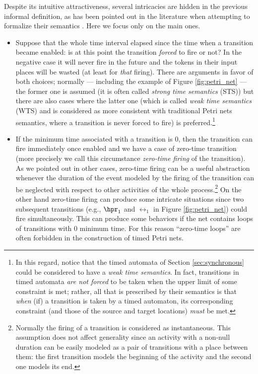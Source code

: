 Despite its intuitive attractiveness, several intricacies are 
hidden in the previous informal definition, as has been pointed 
out in the literature when attempting to formalize their semantics \cite{FMM94,GMMP91}. 
Here we focus only on the main ones.

\begin{itemize}
\item Suppose that the whole time interval elapsed since the time when 
a transition became enabled: is at this point the transition \emph{forced} 
to fire or not? In the negative case it will never fire in the 
future and the tokens in their input places will be wasted (at 
least for \emph{that} firing). There are arguments in favor of both 
choices; normally --- including the example of Figure \ref{fig:petri_net} --- the 
former one is assumed (it is often called \emph{strong time semantics} 
(STS)) but there are also cases where the latter one (which is 
called \emph{weak time semantics} (WTS) and is considered as more 
consistent with traditional Petri nets semantics, where a transition 
is never forced to fire) is preferred.\footnote{In this regard, notice that the timed automata of Section \ref{sec:synchronous} could be considered to have a \emph{weak time semantics}. In fact, transitions in timed automata \emph{are not forced} to be taken when the upper limit of some constraint is met; rather, all that is prescribed by their semantics is that \emph{when} (if) a transition is taken by a timed automaton, its corresponding constraint (and those of the source and target locations) \emph{must} be met.}

\item If the minimum time associated with a transition is 0, then the
  transition can fire immediately once enabled and we have a case of
  zero-time transition (more precisely we call this circumstance
  \emph{zero-time firing} of the transition). As we pointed out in
  other cases, zero-time firing can be a useful abstraction whenever
  the duration of the event modeled by the firing of the transition
  can be neglected with respect to other activities of the whole
  process.\footnote{Normally the firing of a transition is considered
    as instantaneous. This assumption does not affect generality since
    an activity with a non-null duration can be easily modeled as a
    pair of transitions with a place between them: the first
    transition models the beginning of the activity and the second one
    models its end.}  On the other hand zero-time firing can produce
  some intricate situations since two subsequent transitions (e.g.,
  $\hpr_1$ and $\rel_1$ in Figure \ref{fig:petri_net}) could fire
  simultaneously. This can produce some  behaviors if the net
  contains loops of transitions with 0 minimum time. For this reason
  ``zero-time loops'' are often forbidden in the construction of timed
  Petri nets.
\end{itemize}

